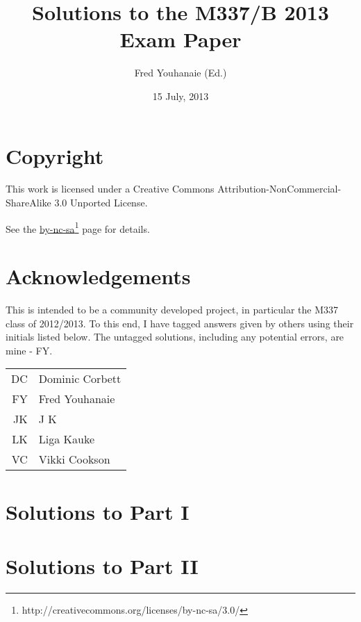 \documentclass[a4paper,fleqn,12pt,twoside]{article}
\title{Solutions to the M337/B 2013 Exam Paper}
\author{Fred Youhanaie (Ed.)}
\date{15 July, 2013}
\begin{document}
\maketitle

\pagestyle{myheadings}

\section*{Copyright}

This work is licensed under a Creative Commons
Attribution-NonCommercial-ShareAlike 3.0 Unported License.

\newcommand\cclink{http://creativecommons.org/licenses/by-nc-sa/3.0/}
See the \href{\cclink}{by-nc-sa}\footnote{\cclink} page for details.

\section*{Acknowledgements}

This is intended to be a community developed project, in particular the
M337 class of 2012/2013. To this end, I have tagged answers given by
others using their initials listed below. The untagged solutions, including
any potential errors, are mine - FY.

\medskip

\begin{tabular}{r|l}
\hline
DC	& Dominic Corbett \\
FY	& Fred Youhanaie \\
JK	& J K \\
LK	& Liga Kauke \\
VC	& Vikki Cookson \\
\hline
\end{tabular}

\newpage
\section*{Solutions to Part I}

\newpage

\newpage

\newpage

\newpage

\newpage

\newpage

\newpage

\newpage

\section*{Solutions to Part II}

\newpage

\newpage

\newpage

\end{document}
